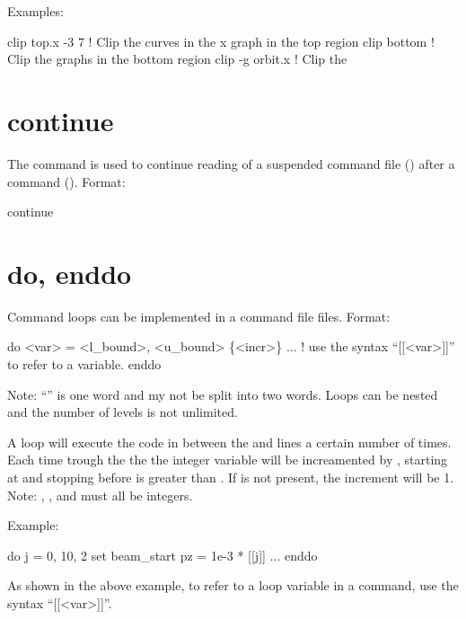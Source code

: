 Examples:
\begin{example}
  clip top.x -3  7  ! Clip the curves in the x graph in the top region
  clip bottom       ! Clip the graphs in the bottom region
  clip -g orbit.x   ! Clip the 
\end{example}

\section{continue}
\label{s:continue}

The  command is used to continue reading of a suspended command file
() after a  command (). Format:
\begin{example}
  continue
\end{example}

\section{do, enddo}
\label{s:do}

Command loops can be implemented in a command file files. Format:
\begin{example}
  do <var> = <l_bound>, <u_bound> \{<incr>\}
    ...   ! use the syntax ``[[<var>]]'' to refer to a variable.
  enddo
\end{example}
Note: ``'' is one word and my not be split into two words.
Loops can be nested and the number of levels is not unlimited. 

A loop will execute the code in between the  and  lines a certain number of
times. Each time trough the the the integer variable  will be increamented by ,
starting at  and stopping before  is greater than . If
 is not present, the increment will be 1. Note: , , and
 must all be integers.

Example:
\begin{example}
  do j = 0, 10, 2
    set beam_start pz = 1e-3 * [[j]]
    ...
  enddo
\end{example}
As shown in the above example, to refer to a loop variable in a command, use the syntax ``[[<var>]]''.

